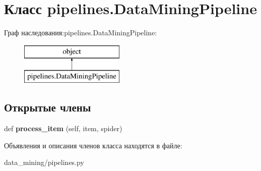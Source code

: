\hypertarget{classpipelines_1_1DataMiningPipeline}{}\section{Класс pipelines.\+Data\+Mining\+Pipeline}
\label{classpipelines_1_1DataMiningPipeline}
Граф наследования\+:pipelines.\+Data\+Mining\+Pipeline\+:\begin{figure}[H]
\begin{center}
\leavevmode
\includegraphics[height=2.000000cm]{classpipelines_1_1DataMiningPipeline}
\end{center}
\end{figure}
\subsection*{Открытые члены}
\begin{DoxyCompactItemize}
\item 
\mbox{\label{classpipelines_1_1DataMiningPipeline_aae5a52dc0c5f5cb2d5ffc518a185a48c}} 
def {\bfseries process\+\_\+item} (self, item, spider)
\end{DoxyCompactItemize}


Объявления и описания членов класса находятся в файле\+:\begin{DoxyCompactItemize}
\item 
data\+\_\+mining/pipelines.\+py\end{DoxyCompactItemize}
